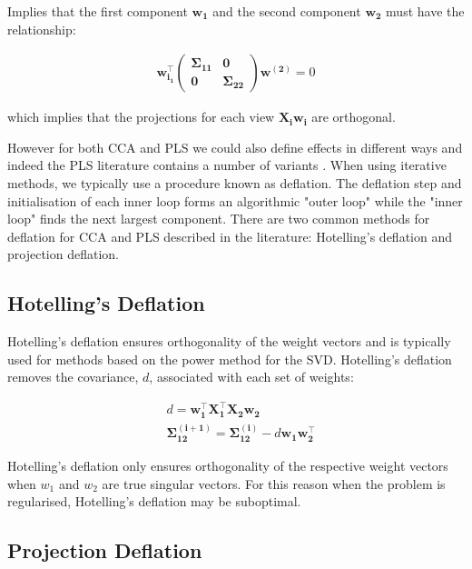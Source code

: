 Implies that the first component $\mathbf{w_1}$ and the second component $\mathbf{w_2}$ must have the relationship:

\begin{align}
    \mathbf{w_{i_1}^{\top}\begin{pmatrix}\mathbf{\Sigma_{11}} & 0 \\0 & \mathbf{\Sigma_{22}}
                          \end{pmatrix}w^{(2)}}=0
\end{align}

which implies that the projections for each view $\mathbf{X_iw_i}$ are orthogonal.

However for both CCA and PLS we could also define effects in different ways and indeed the PLS literature contains a number of variants\cite{hoskuldsson1988pls} \cite{wegelin2000survey}. When using iterative methods, we typically use a procedure known as deflation. The deflation step and initialisation of each inner loop forms an algorithmic "outer loop" while the "inner loop" finds the next largest component. There are two common methods for deflation for CCA and PLS described in the literature: Hotelling's deflation and projection deflation.

\subsection{Hotelling's Deflation}
Hotelling's deflation ensures orthogonality of the weight vectors and is typically used for methods based on the power method for the SVD. Hotelling's deflation removes the covariance, $d$, associated with each set of weights:

\begin{align}
     & d = \mathbf{w^{\top}_1X^{\top}_1X_2w_2}                                            \\
     & \mathbf{\Sigma^{(i+1)}_{12}}= \mathbf{\Sigma^{(i)}_{12}} - d\mathbf{w_1w^{\top}_2}
\end{align}

Hotelling's deflation only ensures orthogonality of the respective weight vectors when $w_1$ and $w_2$ are true singular vectors. For this reason when the problem is regularised, Hotelling's deflation may be suboptimal.

\subsection{Projection Deflation}

